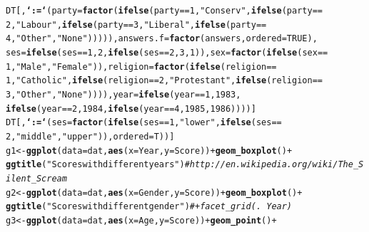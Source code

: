 \documentclass[11pt,letter]{article}\usepackage[]{graphicx}\usepackage[]{color}
\makeatletter
\newcommand{\hlnum}[1]{\textcolor[rgb]{0.686,0.059,0.569}{#1}}%
\newcommand{\hlstr}[1]{\textcolor[rgb]{0.192,0.494,0.8}{#1}}%
\newcommand{\hlcom}[1]{\textcolor[rgb]{0.678,0.584,0.686}{\textit{#1}}}%
\newcommand{\hlopt}[1]{\textcolor[rgb]{0,0,0}{#1}}%
\newcommand{\hlstd}[1]{\textcolor[rgb]{0.345,0.345,0.345}{#1}}%
\newcommand{\hlkwb}[1]{\textcolor[rgb]{0.69,0.353,0.396}{#1}}%
\newcommand{\hlkwc}[1]{\textcolor[rgb]{0.333,0.667,0.333}{#1}}%
\newcommand{\hlkwd}[1]{\textcolor[rgb]{0.737,0.353,0.396}{\textbf{#1}}}%
\newenvironment{kframe}{%
 \def\at@end@of@kframe{}%
 \ifinner\ifhmode%
  \def\at@end@of@kframe{\end{minipage}}%
  \begin{minipage}{\columnwidth}%
 \fi\fi%
 \def\FrameCommand##1{\hskip\@totalleftmargin \hskip-\fboxsep
 \colorbox{shadecolor}{##1}\hskip-\fboxsep
     \hskip-\linewidth \hskip-\@totalleftmargin \hskip\columnwidth}%
 \MakeFramed {\advance\hsize-\width
   \@totalleftmargin\z@ \linewidth\hsize
   \@setminipage}}%
 {\par\unskip\endMakeFramed%
 \at@end@of@kframe}
\newenvironment{knitrout}{}{} %
\makeatother
\begin{document}
\begin{knitrout}
\begin{kframe}
\begin{alltt}
\hlstd{DT[,} \hlkwd{`:=`}\hlstd{(}\hlkwc{party} \hlstd{=} \hlkwd{factor}\hlstd{(}\hlkwd{ifelse}\hlstd{(party} \hlopt{==} \hlnum{1}\hlstd{,} \hlstr{"Conserv"}\hlstd{,} \hlkwd{ifelse}\hlstd{(party} \hlopt{==}
    \hlnum{2}\hlstd{,} \hlstr{"Labour"}\hlstd{,} \hlkwd{ifelse}\hlstd{(party} \hlopt{==} \hlnum{3}\hlstd{,} \hlstr{"Liberal"}\hlstd{,} \hlkwd{ifelse}\hlstd{(party} \hlopt{==}
    \hlnum{4}\hlstd{,} \hlstr{"Other"}\hlstd{,} \hlstr{"None"}\hlstd{))))),} \hlkwc{answers.f} \hlstd{=} \hlkwd{factor}\hlstd{(answers,} \hlkwc{ordered} \hlstd{=} \hlnum{TRUE}\hlstd{),}
    \hlkwc{ses} \hlstd{=} \hlkwd{ifelse}\hlstd{(ses} \hlopt{==} \hlnum{1}\hlstd{,} \hlnum{2}\hlstd{,} \hlkwd{ifelse}\hlstd{(ses} \hlopt{==} \hlnum{2}\hlstd{,} \hlnum{3}\hlstd{,} \hlnum{1}\hlstd{)),} \hlkwc{sex} \hlstd{=} \hlkwd{factor}\hlstd{(}\hlkwd{ifelse}\hlstd{(sex} \hlopt{==}
        \hlnum{1}\hlstd{,} \hlstr{"Male"}\hlstd{,} \hlstr{"Female"}\hlstd{)),} \hlkwc{religion} \hlstd{=} \hlkwd{factor}\hlstd{(}\hlkwd{ifelse}\hlstd{(religion} \hlopt{==}
        \hlnum{1}\hlstd{,} \hlstr{"Catholic"}\hlstd{,} \hlkwd{ifelse}\hlstd{(religion} \hlopt{==} \hlnum{2}\hlstd{,} \hlstr{"Protestant"}\hlstd{,} \hlkwd{ifelse}\hlstd{(religion} \hlopt{==}
        \hlnum{3}\hlstd{,} \hlstr{"Other"}\hlstd{,} \hlstr{"None"}\hlstd{)))),} \hlkwc{year} \hlstd{=} \hlkwd{ifelse}\hlstd{(year} \hlopt{==} \hlnum{1}\hlstd{,} \hlnum{1983}\hlstd{,}
        \hlkwd{ifelse}\hlstd{(year} \hlopt{==} \hlnum{2}\hlstd{,} \hlnum{1984}\hlstd{,} \hlkwd{ifelse}\hlstd{(year} \hlopt{==} \hlnum{4}\hlstd{,} \hlnum{1985}\hlstd{,} \hlnum{1986}\hlstd{))))]}
\hlstd{DT[,} \hlkwd{`:=`}\hlstd{(}\hlkwc{ses} \hlstd{=} \hlkwd{factor}\hlstd{(}\hlkwd{ifelse}\hlstd{(ses} \hlopt{==} \hlnum{1}\hlstd{,} \hlstr{"lower"}\hlstd{,} \hlkwd{ifelse}\hlstd{(ses} \hlopt{==}
    \hlnum{2}\hlstd{,} \hlstr{"middle"}\hlstd{,} \hlstr{"upper"}\hlstd{)),} \hlkwc{ordered} \hlstd{= T))]}
\hlstd{g1} \hlkwb{<-} \hlkwd{ggplot}\hlstd{(}\hlkwc{data} \hlstd{= dat,} \hlkwd{aes}\hlstd{(}\hlkwc{x} \hlstd{= Year,} \hlkwc{y} \hlstd{= Score))} \hlopt{+} \hlkwd{geom_boxplot}\hlstd{()} \hlopt{+}
    \hlkwd{ggtitle}\hlstd{(}\hlstr{"Scores with different years"}\hlstd{)}  \hlcom{# http://en.wikipedia.org/wiki/The_Silent_Scream}
\hlstd{g2} \hlkwb{<-} \hlkwd{ggplot}\hlstd{(}\hlkwc{data} \hlstd{= dat,} \hlkwd{aes}\hlstd{(}\hlkwc{x} \hlstd{= Gender,} \hlkwc{y} \hlstd{= Score))} \hlopt{+} \hlkwd{geom_boxplot}\hlstd{()} \hlopt{+}
    \hlkwd{ggtitle}\hlstd{(}\hlstr{"Scores with different gender"}\hlstd{)}  \hlcom{# + facet_grid(. ~ Year) }
\hlstd{g3} \hlkwb{<-} \hlkwd{ggplot}\hlstd{(}\hlkwc{data} \hlstd{= dat,} \hlkwd{aes}\hlstd{(}\hlkwc{x} \hlstd{= Age,} \hlkwc{y} \hlstd{= Score))} \hlopt{+} \hlkwd{geom_point}\hlstd{()} \hlopt{+}

\end{alltt}
\end{kframe}
\end{knitrout}
\end{document}
